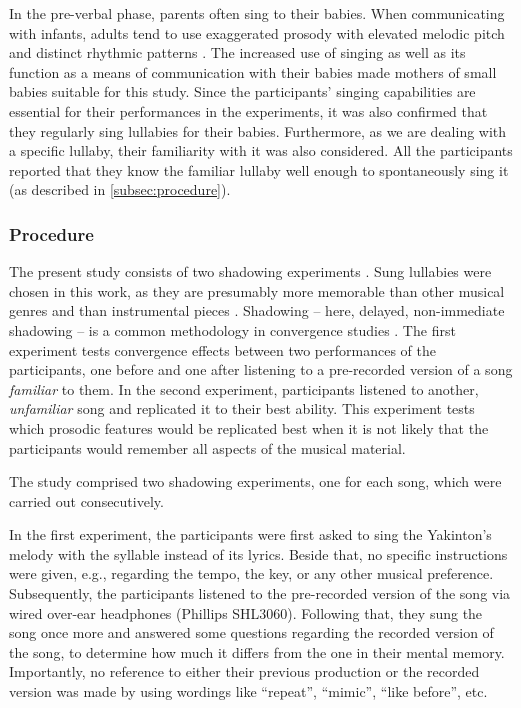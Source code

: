 In the pre-verbal phase, parents often sing to their babies.
When communicating with infants, adults tend to use exaggerated prosody with elevated melodic pitch and distinct rhythmic patterns \citep{Fernald1991prosody}.
The increased use of singing as well as its function as a means of communication with their babies \citep[see][]{Street2003mothers,Papouvsek1991meanings} made mothers of small babies suitable for this study.
Since the participants' singing capabilities are essential for their performances in the experiments, it was also confirmed that they regularly sing lullabies for their babies.
Furthermore, as we are dealing with a specific lullaby, their familiarity with it was also considered.
All the participants reported that they know the familiar lullaby well enough to spontaneously sing it (as described in \cref{subsec:procedure}).

\subsubsection{Procedure}
\label{subsubsec:procedure_music}


The present study consists of two shadowing experiments \citep[cf.][]{Goldinger1998echoes}.
Sung lullabies were chosen in this work, as they are presumably more memorable than other musical genres and than instrumental pieces \citep{Weiss2012something, Trehub1991music}.
Shadowing -- here, delayed, non-immediate shadowing -- is a common methodology in convergence studies \citep[e.g.,][]{Pardo2018comparison}.
The first experiment tests convergence effects between two performances of the participants, one before and one after listening to a pre-recorded version of a song \emph{familiar} to them.
In the second experiment, participants listened to another, \emph{unfamiliar} song and replicated it to their best ability.
This experiment tests which prosodic features would be replicated best when it is not likely that the participants would remember all aspects of the musical material.


The study comprised two shadowing experiments, one for each song, which were carried out consecutively.

In the first experiment, the participants were first asked to sing the Yakinton's melody with the syllable \textipa{[na]} instead of its lyrics.
Beside that, no specific instructions were given, e.g., regarding the tempo, the key, or any other musical preference.
Subsequently, the participants listened to the pre-recorded version of the song via wired over-ear headphones (Phillips SHL3060).
Following that, they sung the song once more and answered some questions regarding the recorded version of the song, to determine how much it differs from the one in their mental memory.
Importantly, no reference to either their previous production or the recorded version was made by using wordings like \enquote{repeat}, \enquote{mimic}, \enquote{like before}, etc.

